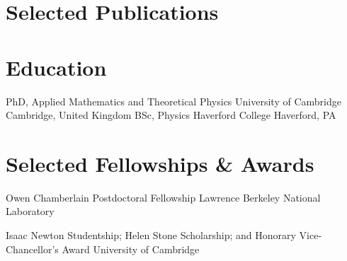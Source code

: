 \documentclass[11pt,a4paper,sans]{moderncv}
\begin{document}
\section{Selected Publications}

\nocite{Farren:DESIDR2CMBLensing,Sailer:2025lxj,ACT:2023oei,Farren:2021grl}
\printbibliography[heading=none]

\section{Education}
  {PhD, Applied Mathematics and Theoretical Physics}
  {University of Cambridge}
  {\newline Cambridge, United Kingdom}
  {}{}
  {BSc, Physics}
  {Haverford College}
  {Haverford, PA}
  {}{}


\section{Selected Fellowships \& Awards}
{Owen Chamberlain Postdoctoral Fellowship}
{Lawrence Berkeley National Laboratory}
{}{}{}

{Isaac Newton Studentship\textnormal{; }
	Helen Stone Scholarship\textnormal{; and }\newline
	Honorary Vice-Chancellor's Award}
{University of Cambridge}
{}{}{}
\end{document}
